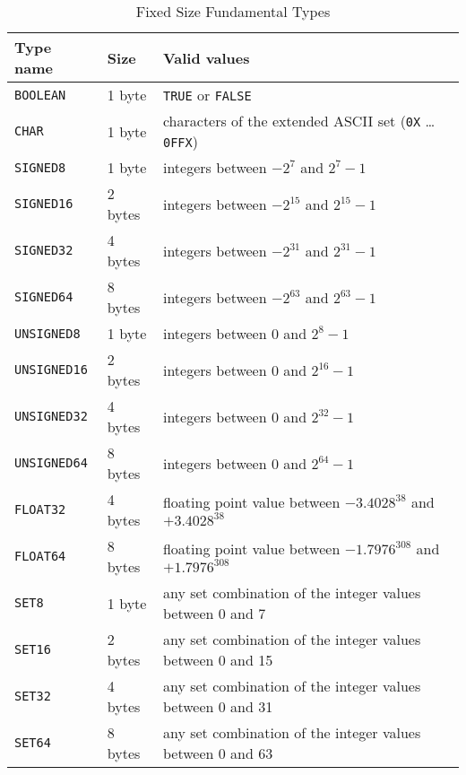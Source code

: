 \documentclass[a4wide,11pt]{article}
\begin{document}
\begin{table}[h!]
\centering
\begin{tabular}{|p{2cm}|p{3cm}|p{8cm}|}
\hline
Type name & Size & Valid values \\
\hline\hline
\verb+BOOLEAN+ & 1 byte & \verb+TRUE+ or \verb+FALSE+ \\
\hline
\verb+CHAR+ & 1 byte & characters of the extended ASCII set (\verb+0X+ \ldots \verb+0FFX+) \\
\hline
\verb+SIGNED8+ & 1 byte & integers between $-2^{7}$ and $2^{7}-1$ \\
\verb+SIGNED16+ & 2 bytes & integers between $-2^{15}$ and $2^{15}-1$ \\
\verb+SIGNED32+ & 4 bytes & integers between $-2^{31}$ and $2^{31}-1$ \\
\verb+SIGNED64+ & 8 bytes & integers between $-2^{63}$ and $2^{63}-1$ \\
\hline
\verb+UNSIGNED8+ & 1 byte & integers between $0$ and $2^{8}-1$ \\
\verb+UNSIGNED16+ & 2 bytes & integers between $0$ and $2^{16}-1$ \\
\verb+UNSIGNED32+ & 4 bytes & integers between $0$ and $2^{32}-1$ \\
\verb+UNSIGNED64+ & 8 bytes & integers between $0$ and $2^{64}-1$ \\
\hline
\verb+FLOAT32+ & 4 bytes & floating point value between $-3.4028^{38}$ and $+3.4028^{38}$ \\
\verb+FLOAT64+ & 8 bytes & floating point value between $-1.7976^{308}$ and $+1.7976^{308}$ \\
\hline
\verb+SET8+ & 1 byte & any set combination of the integer values between 0 and 7 \\
\verb+SET16+ & 2 bytes & any set combination of the integer values between 0 and 15 \\
\verb+SET32+ & 4 bytes & any set combination of the integer values between 0 and 31 \\
\verb+SET64+ & 8 bytes & any set combination of the integer values between 0 and 63 \\
\hline

\end{tabular}

\caption{Fixed Size Fundamental Types}\label{table:BasicTypesFixed}
\end{table}
\end{document}
